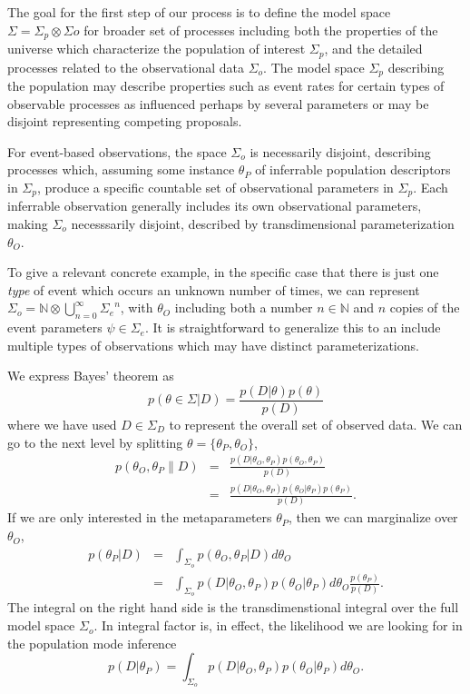 \documentclass[twocolumn,showpacs,aps,prd,nobibnotes,nofootinbib,floatfix]{revtex4-1}
\begin{document}
The goal for the first step of our process is to define the model space $\Sigma=\Sigma_{p}\otimes\Sigma{o}$ for broader set of processes including both the properties of the universe which characterize the population of interest $\Sigma_p$, and the detailed processes related to the observational data $\Sigma_o$.  The model space $\Sigma_p$ describing the population may describe properties such as event rates for certain types of observable processes as influenced perhaps by several parameters or may be disjoint representing competing proposals.

For event-based observations, the space $\Sigma_o$ is necessarily disjoint, describing processes which, assuming some instance $\theta_P$ of inferrable population descriptors in $\Sigma_p$, produce a specific countable set of observational parameters in $\Sigma_p$. Each inferrable observation generally includes its own observational parameters, making $\Sigma_o$ necesssarily disjoint, described by transdimensional parameterization $\theta_O$.

To give a relevant concrete example, in the specific case that there is just one \emph{type} of event which occurs an unknown number of times, we can represent $\Sigma_o=\mathbb{N}\otimes\bigcup_{n=0}^{\infty}{\Sigma_e}^n$, with $\theta_O$ including both a number $n\in \mathbb{N}$ and $n$ copies of the event parameters $\psi\in\Sigma_e$.  It is straightforward to generalize this to an include multiple types of observations which may have distinct parameterizations.

We express Bayes' theorem as
\begin{equation}
  p(\theta\in\Sigma|D)=\frac{p(D|\theta)p(\theta)}{p(D)}
\end{equation}
where we have used $D\in\Sigma_D$ to represent the overall set of observed data.  We can go to the next level by splitting $\theta=\{\theta_P,\theta_O\}$,
\begin{eqnarray*}
  p(\theta_O,\theta_P\|D)&=&\frac{p(D|\theta_O,\theta_P)p(\theta_O,\theta_P)}{p(D)}\\
  &=&\frac{p(D|\theta_O,\theta_P)p(\theta_O|\theta_P)p(\theta_P)}{p(D)}.
\end{eqnarray*}
If we are only interested in the metaparameters $\theta_P$, then we can marginalize over $\theta_O$,
\begin{eqnarray}
  p(\theta_P|D)&=&\int_{\Sigma_o}p(\theta_O,\theta_P|D)
  d{\theta_O}\\
  &=&\int_{\Sigma_o} p(D|\theta_O,\theta_P)p(\theta_O|\theta_P)d\theta_O\frac{ p(\theta_P)}{p(D)}.
\end{eqnarray} 
The integral on the right hand side is the transdimenstional integral over the full model space $\Sigma_o$.  In integral factor is, in effect, the likelihood we are looking for in the population mode inference
\begin{equation}
  p(D|\theta_P)=\int_{\Sigma_o} p(D|\theta_O,\theta_P)p(\theta_O|\theta_P)d\theta_O.
\end{equation}
   
\end{document}
